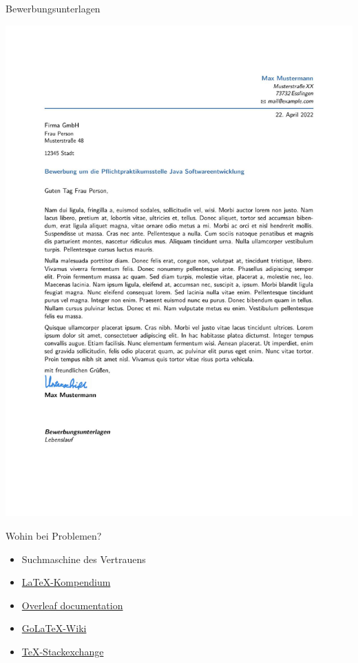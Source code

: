 \documentclass[presentation,aspectratio=169]{beamer}
\begin{document}
\begin{frame}[fragile]{Bewerbungsunterlagen}
\begin{center}
    \includegraphics[height=.7\textheight]{Anschreiben}
  \end{center}
\end{frame}

\begin{frame}{Wohin bei Problemen?}
  \begin{itemize}
    \item Suchmaschine des Vertrauens
    \item \href{https://de.wikibooks.org/wiki/LaTeX-Kompendium}{\LaTeX-Kompendium}
    \item \href{https://www.overleaf.com/learn}{Overleaf documentation}
    \item \href{https://golatex.de/wiki/index.php/Hauptseite}{Go\LaTeX-Wiki}
    \item \href{https://tex.stackexchange.com}{\TeX-Stackexchange}
  \end{itemize}
\end{frame}

\maketitle
\end{document}
